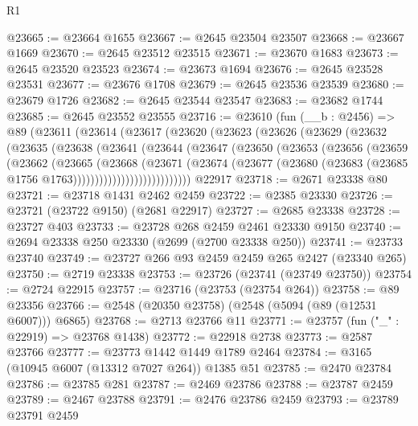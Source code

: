 \begin{lexlean}{R1}
\begin{coremodule}
@23665 := @23664 @1655
@23667 := @2645 @23504 @23507
@23668 := @23667 @1669
@23670 := @2645 @23512 @23515
@23671 := @23670 @1683
@23673 := @2645 @23520 @23523
@23674 := @23673 @1694
@23676 := @2645 @23528 @23531
@23677 := @23676 @1708
@23679 := @2645 @23536 @23539
@23680 := @23679 @1726
@23682 := @2645 @23544 @23547
@23683 := @23682 @1744
@23685 := @2645 @23552 @23555
@23716 := @23610
    (fun (__b : @2456) =>
    @89
      (@23611
        (@23614
          (@23617
            (@23620
              (@23623
                (@23626
                  (@23629
                    (@23632
                      (@23635
                        (@23638
                          (@23641
                            (@23644
                              (@23647
                                (@23650
                                  (@23653
                                    (@23656
                                      (@23659
                                        (@23662
                                          (@23665
                                            (@23668
                                              (@23671
                                                (@23674
                                                  (@23677
                                                    (@23680
                                                      (@23683
                                                        (@23685
                                                          @1756
                                                          @1763)))))))))))))))))))))))))))
    @22917
@23718 := @2671 @23338 @80
@23721 := @23718 @1431 @2462 @2459
@23722 := @2385 @23330
@23726 := @23721 (@23722 @9150) (@2681 @22917)
@23727 := @2685 @23338
@23728 := @23727 @403
@23733 := @23728 @268 @2459 @2461 @23330 @9150
@23740 := @2694 @23338 @250 @23330 (@2699 (@2700 @23338 @250))
@23741 := @23733 @23740
@23749 := @23727 @266 @93 @2459 @2459 @265 @2427 (@23340 @265)
@23750 := @2719 @23338
@23753 := @23726 (@23741 (@23749 @23750))
@23754 := @2724 @22915
@23757 := @23716 (@23753 (@23754 @264))
@23758 := @89 @23356
@23766 := @2548 (@20350 @23758) (@2548 (@5094 (@89 (@12531 @6007))) @6865)
@23768 := @2713 @23766 @11
@23771 := @23757 (fun ("_" : @22919) => @23768 @1438)
@23772 := @22918 @2738
@23773 := @2587 @23766
@23777 := @23773 @1442 @1449 @1789 @2464
@23784 := @3165 (@10945 @6007 (@13312 @7027 @264)) @1385 @51
@23785 := @2470 @23784
@23786 := @23785 @281
@23787 := @2469 @23786
@23788 := @23787 @2459
@23789 := @2467 @23788
@23791 := @2476 @23786 @2459
@23793 := @23789 @23791 @2459

\end{coremodule}
\end{lexlean}
